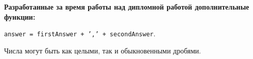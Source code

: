 \textbf{Разработанные за время работы над дипломной работой дополнительные функции:}

\texttt{answer = firstAnswer + ',' + secondAnswer}.

Числа могут быть как целыми, так и обыкновенными дробями.





